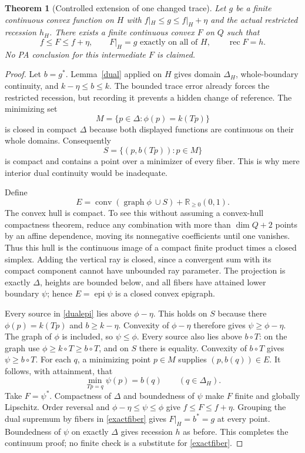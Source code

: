 \documentclass[11pt]{article}
\newtheorem{theorem}{Theorem}[section]
\theoremstyle{definition}\newtheorem{definition}[theorem]{Definition}
\theoremstyle{remark}\newtheorem{remark}[theorem]{Remark}
\newcommand{\R}{\mathbb R}\newcommand{\Q}{\mathbb Q}
\newcommand{\epi}{\operatorname{epi}}\newcommand{\conv}{\operatorname{conv}}\newcommand{\cone}{\operatorname{cone}}
\newcommand{\rec}{\operatorname{rec}}\newcommand{\dom}{\operatorname{dom}}
\begin{document}
\begin{theorem}[Controlled extension of one changed trace]\label{trace}
Let $g$ be a finite continuous convex function on $H$ with
$f|_H\leq g\leq f|_H+\eta$ and the actual restricted recession $h_H$. There exists a finite continuous convex $F$ on $Q$ such that
\[
f\leq F\leq f+\eta,\qquad F|_H=g\text{ exactly on all of }H,\qquad \rec F=h.
\]
No PA conclusion for this intermediate $F$ is claimed.
\end{theorem}
\begin{proof}
Let $b=g^*$. Lemma~\ref{dual} applied on $H$ gives domain $\Delta_H$, whole-boundary continuity, and
$k-\eta\leq b\leq k$. The bounded trace error already forces the restricted recession, but recording it prevents a hidden change of reference. The minimizing set
\[
M=\{p\in\Delta:\phi(p)=k(Tp)\}
\]
is closed in compact $\Delta$ because both displayed functions are continuous on their whole domains. Consequently
\begin{equation}\label{S}
S=\{(p,b(Tp)):p\in M\}
\end{equation}
is compact and contains a point over a minimizer of every fiber. This is why mere interior dual continuity would be inadequate.

Define
\begin{equation}\label{dualepi}
E=\conv(\operatorname{graph}\phi\ \cup S)+\R_{\geq0}(0,1).
\end{equation}
The convex hull is compact. To see this without assuming a convex-hull compactness theorem, reduce any combination with more than $\dim Q+2$ points by an affine dependence, moving its nonnegative coefficients until one vanishes. Thus this hull is the continuous image of a compact finite product times a closed simplex. Adding the vertical ray is closed, since a convergent sum with its compact component cannot have unbounded ray parameter. The projection is exactly $\Delta$, heights are bounded below, and all fibers have attained lower boundary $\psi$; hence $E=\epi\psi$ is a closed convex epigraph.

Every source in \eqref{dualepi} lies above $\phi-\eta$. This holds on $S$ because there $\phi(p)=k(Tp)$ and $b\geq k-\eta$. Convexity of $\phi-\eta$ therefore gives $\psi\geq\phi-\eta$. The graph of $\phi$ is included, so $\psi\leq\phi$. Every source also lies above $b\circ T$: on the graph use $\phi\geq k\circ T\geq b\circ T$, and on $S$ there is equality. Convexity of $b\circ T$ gives $\psi\geq b\circ T$. For each $q$, a minimizing point $p\in M$ supplies $(p,b(q))\in E$. It follows, with attainment, that
\begin{equation}\label{exactfiber}
\min_{Tp=q}\psi(p)=b(q)\qquad(q\in\Delta_H).
\end{equation}
Take $F=\psi^*$. Compactness of $\Delta$ and boundedness of $\psi$ make $F$ finite and globally Lipschitz. Order reversal and $\phi-\eta\leq\psi\leq\phi$ give $f\leq F\leq f+\eta$. Grouping the dual supremum by fibers in \eqref{exactfiber} gives $F|_H=b^*=g$ at every point. Boundedness of $\psi$ on exactly $\Delta$ gives recession $h$ as before. This completes the continuum proof; no finite check is a substitute for \eqref{exactfiber}.
\end{proof}
\end{document}
